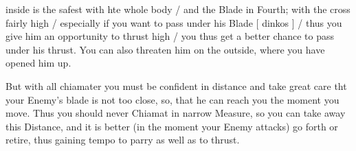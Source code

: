 \newpage


\newpage



inside is the safest with hte whole body / and the Blade in Fourth;
with the cross fairly high / especially if you want to pass under his
Blade [ dinkos ] / thus you give him an
opportunity to thrust high / you thus get a better chance to pass
under his thrust. You can also threaten him on the outside, where you
have opened him up.


But with all chiamater you must be confident in distance and take great
care tht your Enemy's blade is not too close, so,  that he can reach you
the moment you move. Thus you should never Chiamat in narrow Measure, so
you can take away this Distance, and it is better (in the moment your
Enemy attacks) go forth or retire, thus gaining tempo to parry as well
as to thrust.


